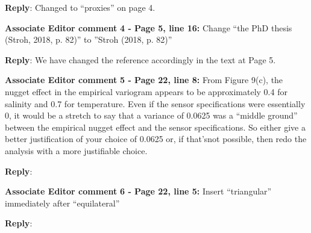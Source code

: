 \documentclass[a4paper]{article}
\def\aecom{\textbf{Associate Editor comment }}
\def\reply{\textbf{Reply}}
\begin{document}
\vspace{5mm}
\reply: Changed to “proxies” on page 4.

\vspace{5mm}
\noindent \aecom \textbf{4 - Page 5, line 16:}  Change  “the  PhD  thesis  (Stroh,  2018,  p.  82)”  to ”Stroh (2018, p. 82)”

\vspace{5mm}
\reply: We have changed the reference accordingly in the text at Page 5. 

\vspace{5mm}
\noindent \aecom \textbf{5 - Page 22, line 8:}  From Figure 9(c), the nugget effect in the empirical variogram appears to be approximately 0.4 for salinity and 0.7 for temperature.  Even if the sensor specifications were essentially 0, it would be a stretch to say that a variance of 0.0625 was a “middle ground” between the empirical nugget effect and the sensor specifications.  So either give a better justification of your choice of 0.0625 or, if that’snot possible, then redo the analysis with a more justifiable choice.

\vspace{5mm}
\reply:

\vspace{5mm}
\noindent \aecom \textbf{6 - Page 22, line 5:}  Insert “triangular” immediately after “equilateral”

\vspace{5mm}
\reply:

\vspace{1em}


\footnotesize



\end{document}
